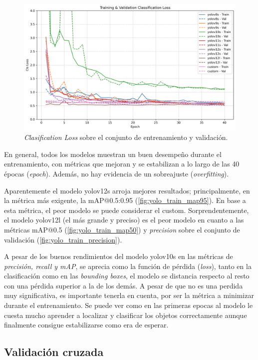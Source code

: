 \documentclass[12pt,a4paper,onecolumn,oneside]{report}
\begin{document}
\begin{figure}[H]
  \centering
  \includegraphics[width=1.0\textwidth]{figuras/yolo_plots/cls_loss.png}
  \caption{\textit{Clasification Loss} sobre el conjunto de entrenamiento y validación.}
  \label{fig:yolo_train_cls_loss}
\end{figure}

En general, todos los modelos muestran un buen desempeño durante el entrenamiento, con métricas que mejoran y se estabilizan a lo largo de las 40 épocas (\textit{epoch}). Además, 
no hay evidencia de un sobreajuste (\textit{overfitting}).

Aparentemente el modelo yolov12s arroja mejores resultados; principalmente, en la métrica más exigente, la mAP@0.5:0.95 (\autoref{fig:yolo_train_map95}). En base a esta métrica, el peor modelo se puede considerar el custom.
Sorprendentemente, el modelo yolov12l (el más grande y preciso) es el peor modelo en cuanto a las métricas mAP@0.5 (\autoref{fig:yolo_train_map50}) y \textit{precision} sobre el conjunto de validación (\autoref{fig:yolo_train_precision}). 

A pesar de los buenos rendimientos del modelo yolov10s en las métricas de \textit{precisión, recall y mAP}, se aprecia como la función de pérdida (\textit{loss}), tanto en la clasificación como en las \textit{bounding boxes},
el modelo se distancia respecto al resto con una pérdida superior a la de los demás. A pesar de que no es una perdida muy significativa, es importante tenerla en cuenta, por ser la métrica a minimizar durante el entrenamiento.
Se puede ver como en las primeras epocas al modelo le cuesta mucho aprender a localizar y clasificar los objetos correctamente aunque finalmente consigue estabilizarse como era de esperar.

\subsection{Validación cruzada}
\end{document}
